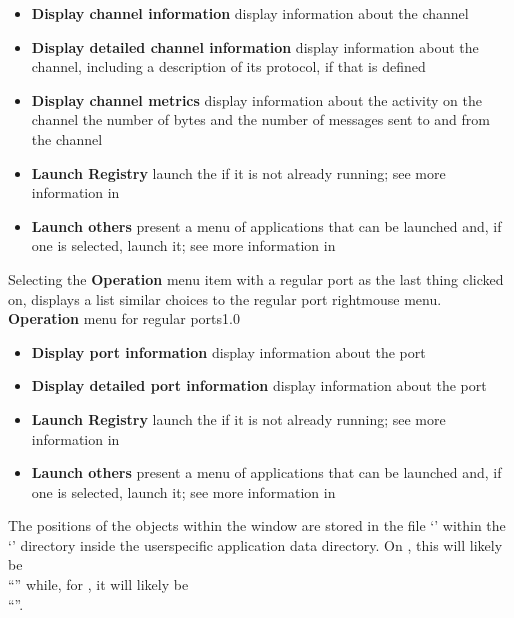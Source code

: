 \begin{itemize}
\item\textbf{Display channel information} display information about the channel
\item\exSp\textbf{Display detailed channel information} display information about the
channel, including a description of its protocol, if that is defined
\item\exSp\textbf{Display channel metrics} display information about the activity on the
channel \longDash{} the number of bytes and the number of messages sent to and from the
channel
\item\exSp\textbf{Launch Registry} launch the \emph{\RS} if it is not already running; see
more information in\\
\item\exSp\textbf{Launch others \textellipsis} present a menu of applications that can be
launched and, if one is selected, launch it; see more information in
\end{itemize}
\condPage{}
Selecting the \textbf{Operation} menu item with a regular port as the last thing clicked on,
displays a list similar choices to the regular port right\longDash{}mouse menu.\\
%
{\textbf{Operation} menu for regular ports}{1.0}
\begin{itemize}
\item\textbf{Display port information} display information about the port
\item\exSp\textbf{Display detailed port information} display information about the port
\item\exSp\textbf{Launch Registry} launch the \emph{\RS} if it is not already running; see
more information in\\
\item\exSp\textbf{Launch others \textellipsis} present a menu of applications that can be
launched and, if one is selected, launch it; see more information in
\end{itemize}
\condPage{}
The positions of the objects within the window are stored in the file
`' within the `' directory inside the
user\longDash{}specific application data directory.
On \win, this will likely be\\
``'' while, for \osx, it will likely be\\
``''.\\
\primaryEnd{}
